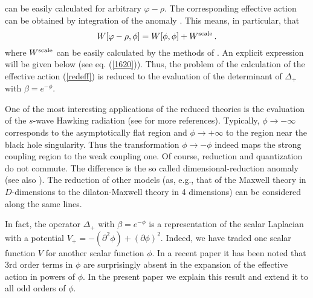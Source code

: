 \documentclass[a4paper,12pt]{article}
\begin{document}
can be easily calculated for arbitrary $\varphi -\rho$.
The corresponding effective action can be
obtained by integration of the anomaly \cite{Kummer:1997jr,Mukhanov:1994ax}.
This means, in particular, that 
\begin{equation}
W[\varphi -\rho ,\phi ]=W[\phi ,\phi ]+W^{\mbox{\scriptsize scale}}\,.
\label{scaling}
\end{equation}
where $W^{\mbox{\scriptsize scale}}$ can be easily calculated
by the methods of 
\cite{Kummer:1997jr,Alvarez:1983zi,Dowker:1990ue,Tseytlin:2000jr}.
An explicit expression will be given below (see eq. (\ref{1620})).
Thus, the problem of the calculation of the
effective action (\ref{redeff}) is  reduced to the evaluation of 
the determinant of $\Delta_+$ with $\beta =e^{-\phi}$.

One of the most interesting applications of the reduced
theories is the evaluation of the $s$-wave Hawking radiation
\cite{Mukhanov:1994ax} (see \cite{Kummer:1999zy} for more references).
Typically, $\phi\to -\infty$ corresponds to the asymptotically
flat region and $\phi\to +\infty$ to the region near the
black hole singularity. Thus the transformation $\phi \to -\phi$
indeed maps the strong coupling region to the weak coupling one.
Of course, reduction and quantization do not commute. The difference
is the so called dimensional-reduction anomaly 
\cite{Frolov:2000an,Sutton:2000gm,Cognola:2000xp} 
(see also \cite{Nojiri:1999br}).
The reduction of other models (as, e.g., that of the Maxwell
theory in $D$-dimensions to the dilaton-Maxwell theory in
4 dimensions) can be considered along the same lines.

In fact, the operator $\Delta_+$ with $\beta =e^{-\phi}$
is a representation of the scalar Laplacian with a
potential $V_+=-(\partial^2 \phi )+(\partial \phi )^2$.
Indeed, we have traded one scalar function $V$ for another
scalar function $\phi$.
In a recent paper \cite{GusevZelnikov99}
it has been noted that 3rd order terms in $\phi$ are surprisingly 
absent in the expansion of the effective action in powers of $\phi$. 
In the present paper we explain
this result and extend it to all odd orders of $\phi$.
\end{document}
